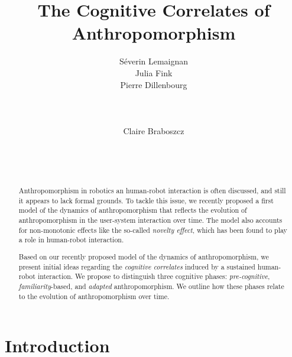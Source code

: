 \documentclass{sig-alternate-2013}
\begin{document}
\title{The Cognitive Correlates of Anthropomorphism}

\author{
\alignauthor
Séverin Lemaignan\\
Julia Fink\\
Pierre Dillenbourg\\
    \\
    \\
    \\
\alignauthor
Claire Braboszcz\\
    \\
    \\
    \\
}

\maketitle

\begin{abstract}

Anthropomorphism in robotics an human-robot interaction is often discussed,
and still it appears to lack formal grounds. To tackle this issue, we recently
proposed a first model of the dynamics of anthropomorphism that reflects the evolution of anthropomorphism in the user-system interaction over time. The model also accounts for
non-monotonic effects like the so-called \emph{novelty effect}, which has been found
to play a role in human-robot interaction.

Based on our recently proposed model of the dynamics of anthropomorphism, we
present initial ideas regarding the \emph{cognitive correlates} induced by a
sustained human-robot interaction. We propose to distinguish three cognitive
phases: \emph{pre-cognitive}, \emph{familiarity}-based, and \emph{adapted}
anthropomorphism. We outline how these phases relate to the evolution of
anthropomorphism over time.

\end{abstract}


\section{Introduction}
\label{sec:intro}
\end{document}
